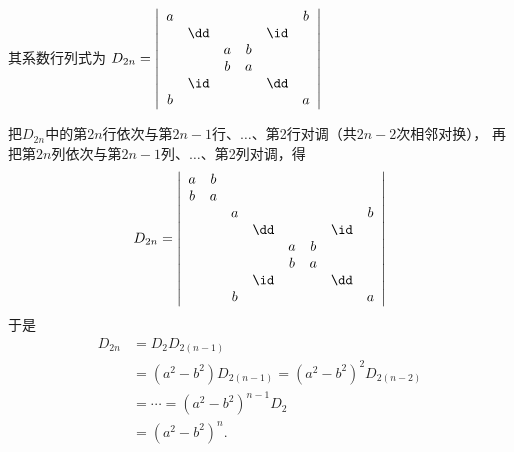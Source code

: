 \begin{jie}
其系数行列式为
$
D_{2n} = \left|
\begin{array}{cccccc}
a &     & & & & b \\
& \dd & & & \id & \\
&   & a & b &  & \\
&   & b & a &  &  \\
& \id & & & \dd & \\
b &     & & & & a
\end{array}
\right|
$





把$D_{2n}$中的第$2n$行依次与第$2n-1$行、$\ldots$、第2行对调（共$2n-2$次相邻对换），
再把第$2n$列依次与第$2n-1$列、$\ldots$、第2列对调，得
$$
D_{2n} = \left|
\begin{array}{cccccccc}
a & b &   &      & & & &  \\
b & a &   & & &  & &\\
&   & a & & &  & & b \\
&   &   & \dd &  &  & \id &   \\
&   &   &     & a& b& & \\
&   &   &     & b& a& & \\
&   &   & \id &  &  & \dd &   \\
&   & b & & &  & & a
\end{array}
\right|
$$
于是
$$
\begin{array}{ll}
D_{2n} & = D_2 D_{2(n-1)}  \\[0.4cm]
& = (a^2-b^2)D_{2(n-1)} 
= (a^2-b^2)^2 D_{2(n-2)}\\[0.4cm]
& = \cdots 
= (a^2-b^2)^{n-1}D_{2} \\[0.4cm]
& = (a^2-b^2)^n.      
\end{array}
$$







\end{jie}
